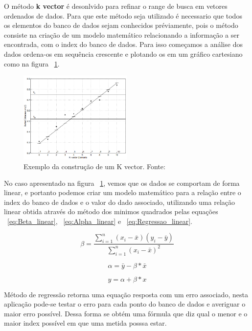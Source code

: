 O método \textbf{k vector} é desonlvido para refinar o range de busca em vetores ordenados de dados. 
Para que este método seja utilizado é necessario que todos os elementos do banco de dados sejam conhecidos préviamente, 
pois o método consiste na criação de um modelo matemático relacionando a informação a ser encontrada, com o index do banco de dados.
Para isso começamos a análise dos dados ordena-os em sequência crescente e plotando os em um  gráfico cartesiano como na figura ~\ref{fig:K_vector}.
\begin{figure}[h]
	\centering
	\includegraphics[width=0.5\textwidth]{images/k_vector.png}
	\caption{Exemplo da construção de um K vector. Fonte: ~\cite[]{Mortari}}
	\label{fig:K_vector} 
\end{figure}

No caso apresentado na figura ~\ref{fig:K_vector}, vemos que os dados se comportam de forma linear, e portanto podemos criar um modelo matemático para a relação entre o index do banco de dados e o valor do dado associado, utilizando uma relação linear obtida através do método dos minimos quadrados pelas equações ~\ref{eq:Beta_linear}, ~\ref{eq:Alpha_linear} e ~\ref{eq:Regressao_linear}.

\begin{equation}
	\beta = \frac{\sum_{i=1}^{n} (x_i - \bar{x})(y_i - \bar{y})}{\sum_{i=1}^{n} (x_i - \bar{x})^2}
	\label{eq:Beta_linear}
\end{equation}

\begin{equation}
	\alpha = \bar{y} - \beta * \bar{x}
	\label{eq:Alpha_linear}
\end{equation}

\begin{equation}
	y = \alpha + \beta * x
	\label{eq:Regressao_linear}
\end{equation}

Método de regressão retorna uma equação resposta com um erro associado, nesta aplicação pode-se testar o erro para cada ponto do banco de dados e averiguar o maior erro possível.
Dessa forma se obtém uma fórmula que diz qual o menor e o maior index possível em que uma metida posssa estar.

